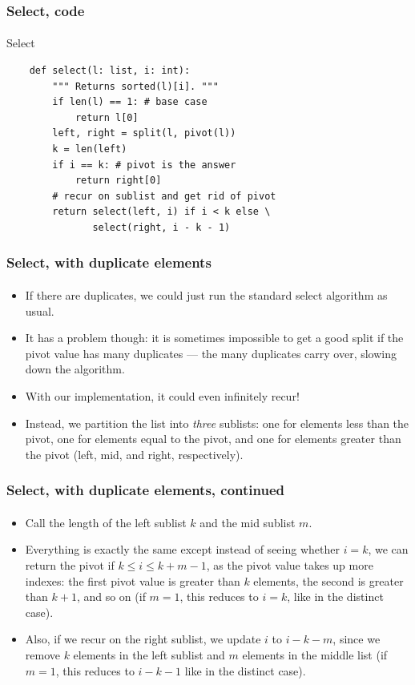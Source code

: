 \documentclass{beamer}                             %
\begin{document}
\begin{frame}[fragile]
\frametitle{Select, code}
\framesubtitle{}
\begin{algorithm}[H]
  \caption{Select}
  \begin{verbatim}
    def select(l: list, i: int):
        """ Returns sorted(l)[i]. """
        if len(l) == 1: # base case
            return l[0]
        left, right = split(l, pivot(l))
        k = len(left)
        if i == k: # pivot is the answer
            return right[0]
        # recur on sublist and get rid of pivot
        return select(left, i) if i < k else \
               select(right, i - k - 1)
  \end{verbatim}
\end{algorithm}
\end{frame}

\begin{frame}
\frametitle{Select, with duplicate elements}
\framesubtitle{}
\begin{itemize}
  \item If there are duplicates, we could just
    run the standard select algorithm as usual.
  \item It has a problem though: it is sometimes impossible to
    get a good split if the pivot value has many duplicates ---
    the many duplicates carry over, slowing down the algorithm.
  \item With our implementation, it could even infinitely recur! \pause
  \item Instead, we partition the list into \emph{three} sublists: one for
    elements less than the pivot, one for elements equal to the pivot, and one
    for elements greater than the pivot (left, mid, and right, respectively).
\end{itemize}
\end{frame}

\begin{frame}
\frametitle{Select, with duplicate elements, continued}
\framesubtitle{}
\begin{itemize}
  \item Call the length of the left sublist
    \( k \) and the mid sublist \( m \).
  \item Everything is exactly the same except instead of seeing whether \(
    i = k \), we can return the pivot if \( k \leq i \leq k + m - 1 \), as the
    pivot value takes up more indexes: the first pivot value is greater than \(
    k \) elements, the second is greater than \( k + 1 \), and so on (if \( m
    = 1 \), this reduces to \( i = k \), like in the distinct case). \pause
  \item Also, if we recur on the right sublist, we update \( i \) to \( i -
    k - m \), since we remove \( k \) elements in the left sublist and \( m \)
    elements in the middle list (if \( m = 1 \), this reduces to \( i - k - 1
    \) like in the distinct case).
\end{itemize}
\end{frame}
\end{document}
